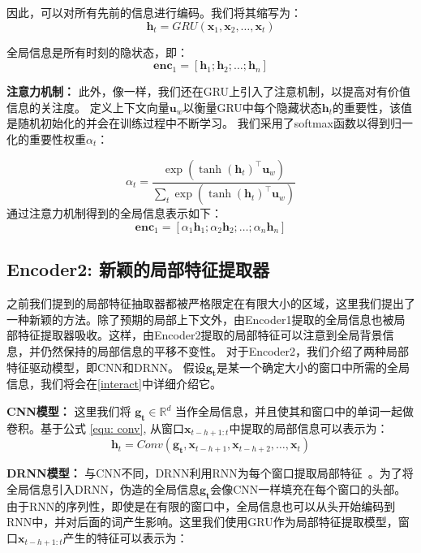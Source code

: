 因此，可以对所有先前的信息进行编码。我们将其缩写为：
\begin{equation}
\mathbf{h}_{t} = GRU(\mathbf{x}_{1}, \mathbf{x}_{2}, \ldots, \mathbf{x}_{t})
\end{equation}

全局信息是所有时刻的隐状态，即：
\begin{equation}
\mathbf{enc}_1 = [\mathbf{h}_{1}; \mathbf{h}_{2}; \ldots; \mathbf{h}_{n}]
\end{equation}

\textbf{注意力机制： }
此外，像一样，我们还在GRU上引入了注意机制，以提高对有价值信息的关注度。
定义上下文向量$\mathbf{u}_{w}$以衡量GRU中每个隐藏状态$\mathbf{h}_{t}$的重要性，该值是随机初始化的并会在训练过程中不断学习。
我们采用了softmax函数以得到归一化的重要性权重$\alpha_{t}$：

\begin{equation}
{\alpha_{t}} = \frac{\exp({\tanh(\mathbf{h}_{t})}^\top \mathbf{u}_{w})} {\sum_{t} \exp({\tanh(\mathbf{h}_{t})}^\top \mathbf{u}_{w})}
\end{equation}
通过注意力机制得到的全局信息表示如下：
\begin{equation}
\mathbf{enc}_1 = [\alpha_{1}\mathbf{h}_{1}; \alpha_{2}\mathbf{h}_{2}; \ldots; \alpha_{n}\mathbf{h}_{n}]
\end{equation}

\subsection{Encoder2: 新颖的局部特征提取器}
\label{encoder2}
之前我们提到的局部特征抽取器都被严格限定在有限大小的区域，这里我们提出了一种新颖的方法。除了预期的局部上下文外，由Encoder1提取的全局信息也被局部特征提取器吸收。这样，由Encoder2提取的局部特征可以注意到全局背景信息，并仍然保持的局部信息的平移不变性。
对于Encoder2，我们介绍了两种局部特征驱动模型，即CNN和DRNN。
假设$\mathbf{g_t}$是某一个确定大小的窗口中所需的全局信息，我们将会在\ref{interact}中详细介绍它。

\textbf{CNN模型： } 这里我们将 $\mathbf{g_t} \in \mathbb{R}^{d}$ 当作全局信息，并且使其和窗口中的单词一起做卷积。基于公式 \ref{equ: conv}, 从窗口$\mathbf{x}_{t-h+1:t}$中提取的局部信息可以表示为：
\begin{equation}
\mathbf{h}_{t} = Conv(\mathbf{g_t}, \mathbf{x}_{t-h+1}, \mathbf{x}_{t-h+2}, \ldots, \mathbf{x}_{t})
\end{equation}

\textbf{DRNN模型：}
与CNN不同，DRNN利用RNN为每个窗口提取局部特征~\citep{wang2018disconnected}。为了将全局信息引入DRNN，伪造的全局信息$\mathbf{g_t}$会像CNN一样填充在每个窗口的头部。由于RNN的序列性，即使是在有限的窗口中，全局信息也可以从头开始编码到RNN中，并对后面的词产生影响。这里我们使用GRU作为局部特征提取模型，窗口$\mathbf{x}_{t-h+1:t}$产生的特征可以表示为：

